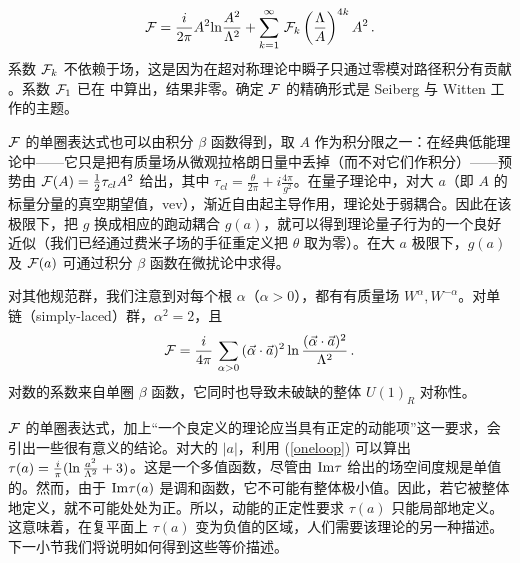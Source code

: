 $$
{\cal F}=\frac{i}{2\pi} A^2 {\rm ln} \frac{A^2}{\Lambda^2}
+\sum_{k=1}^\infty\,{\cal F}_k\left(\frac{\Lambda}{A}\right)^{4k}A^2\,.
$$
系数 ${\cal F}_k$ 不依赖于场，这是因为在超对称理论中瞬子只通过零模对路径积分有贡献 \cite{DD}。系数 ${\cal F}_1$ 已在 \cite{Seiberg88} 中算出，结果非零。确定 ${\cal F}$ 的精确形式是 Seiberg 与 Witten 工作的主题。

${\cal F}$ 的单圈表达式也可以由积分 $\beta$ 函数得到，取 $A$ 作为积分限之一：在经典低能理论中——它只是把有质量场从微观拉格朗日量中丢掉（而不对它们作积分）——预势由 ${\cal F}(A)=\frac{1}{2} \tau_{cl}A^2$ 给出，其中 $\tau_{cl}=\frac{\theta}{2\pi}+i\frac{4\pi}{g^2}$。在量子理论中，对大 $a$（即 $A$ 的标量分量的真空期望值，vev），渐近自由起主导作用，理论处于弱耦合。因此在该极限下，把 $g$ 换成相应的跑动耦合 $g(a)$，就可以得到理论量子行为的一个良好近似（我们已经通过费米子场的手征重定义把 $\theta$ 取为零）。在大 $a$ 极限下，$g(a)$ 及 ${\cal F}(a)$ 可通过积分 $\beta$ 函数在微扰论中求得。


对其他规范群，我们注意到对每个根 $\alpha$（$\alpha > 0$），都有有质量场 $W^{\alpha}, W^{- \alpha}$。对单链（simply-laced）群，$\alpha^{2} = 2$，且
$$
{\cal F} = \frac{i}{4\pi} \, \sum_{\alpha > 0} \, (\vec{\alpha} \cdot
\vec{a})^{2} \, {\rm ln}\, \frac{(\vec{\alpha}\cdot
\vec{a})^{2}}{\Lambda^{2}}\,.
$$
对数的系数来自单圈 $\beta$ 函数，它同时也导致未破缺的整体 $U(1)_{R}$ 对称性。

${\cal F}$ 的单圈表达式，加上“一个良定义的理论应当具有正定的动能项”这一要求，会引出一些很有意义的结论。对大的 $|a|$，利用 (\ref{oneloop}) 可以算出 $\tau(a)=\frac{i}{\pi}({\rm ln}\,\frac{a^2}{\Lambda^2}+ 3)$。这是一个多值函数，尽管由 ${\rm Im}\tau$ 给出的场空间度规是单值的。然而，由于 ${\rm Im}\tau(a)$ 是调和函数，它不可能有整体极小值。因此，若它被整体地定义，就不可能处处为正。所以，动能的正定性要求 $\tau(a)$ 只能局部地定义。这意味着，在复平面上 $\tau(a)$ 变为负值的区域，人们需要该理论的另一种描述。下一小节我们将说明如何得到这些等价描述。

